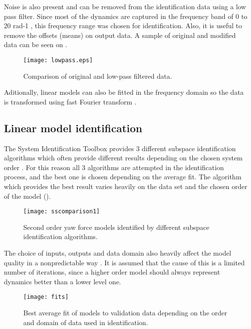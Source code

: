 
Noise is also present and can be removed from the identification data using a low pass filter.
Since most of the dynamics are captured in the frequency band of 0 to 20 rad-1 , this frequency range was chosen for identification.
Also, it is useful to remove the offsets (means) on output data.
A sample of original and modified data can be seen on .

\begin{figure}[H]
\centering
\texttt{[image: lowpass.eps]}
\caption{Comparison of original and low-pass filtered data.}
\label{figlowpass}
\end{figure}

Aditionally, linear models can also be fitted in the frequency domain so the data is transformed using fast Fourier transform \cite{van1992computational}.

\subsection{Linear model identification}
The System Identification Toolbox provides 3 different subspace identification algorithms which often provide different results depending on the chosen system order \cite{van1994n4sid}. 
For this reason all 3 algorithms are attempted in the identification process, and the best one is chosen depending on the average fit.
The algorithm which provides the best result varies heavily on the data set and the chosen order of the model ().

\begin{figure}[H]
\centering
\hspace{-2em}\texttt{[image: sscomparison1]}
\caption{Second order yaw force models identified by different subspace identification algorithms.}
\label{fig:ssid1}
\end{figure}

The choice of inputs, outputs and data domain also heavily affect the model quality in a nonpredictable way .
It is assumed that the cause of this is a limited number of iterations, since a higher order model should always represent dynamics better than a lower level one.

\begin{figure}[H]
\hspace{-2.5em}\texttt{[image: fits]}
\caption{Best average fit of models to validation data depending on the order and domain of data used in identification.}
\label{fig:fits}
\end{figure}

